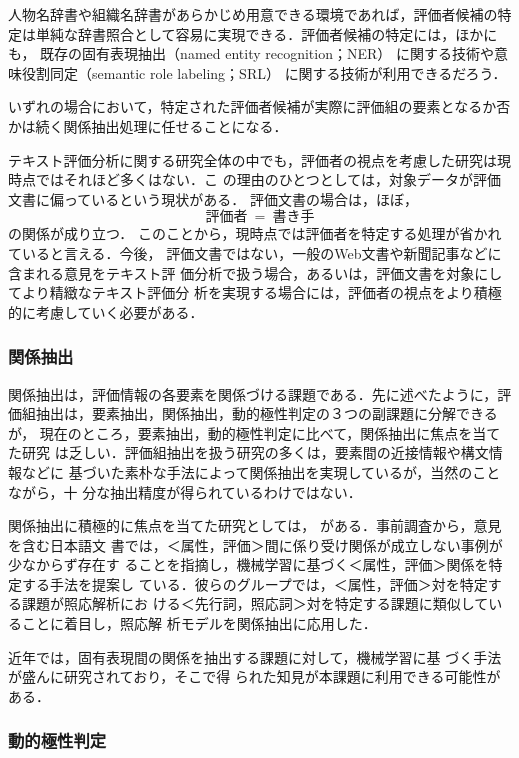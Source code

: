 人物名辞書や組織名辞書があらかじめ用意できる環境であれば，評価者候補の特
定は単純な辞書照合として容易に実現できる．評価者候補の特定には，ほかにも，
既存の固有表現抽出（named entity recognition；NER）\cite{muc6,muc7,irex} 
に関する技術や意味役割同定（semantic role labeling；SRL）
\cite{srl2004,srl2005}に関する技術が利用できるだろう．

いずれの場合において，特定された評価者候補が実際に評価組の要素となるか否
かは続く関係抽出処理に任せることになる．

テキスト評価分析に関する研究全体の中でも，評価者の視点を考慮した研究は現
時点ではそれほど多くはない\cite{kim2004a,bethard2004a,nakayama2005a}．こ
の理由のひとつとしては，対象データが評価文書に偏っているという現状がある．
評価文書の場合は，ほぼ，$$評価者~=~書き手$$の関係が成り立つ．
このことから，現時点では評価者を特定する処理が省かれていると言える．今後，
評価文書ではない，一般のWeb文書や新聞記事などに含まれる意見をテキスト評
価分析で扱う場合，あるいは，評価文書を対象にしてより精緻なテキスト評価分
析を実現する場合には，評価者の視点をより積極的に考慮していく必要がある．

\subsubsection{関係抽出}
\label{sec:rel_ext}

関係抽出は，評価情報の各要素を関係づける課題である．先に述べたように，評
価組抽出は，要素抽出，関係抽出，動的極性判定の３つの副課題に分解できるが，
現在のところ，要素抽出，動的極性判定に比べて，関係抽出に焦点を当てた研究
は乏しい．評価組抽出を扱う研究の多くは，要素間の近接情報や構文情報などに
基づいた素朴な手法によって関係抽出を実現しているが，当然のことながら，十
分な抽出精度が得られているわけではない．

関係抽出に積極的に焦点を当てた研究としては，
\cite{kobayashi2005b,iida2005a}がある．事前調査から，意見を含む日本語文
書では，＜属性，評価＞間に係り受け関係が成立しない事例が少なからず存在す
ることを指摘し，機械学習に基づく＜属性，評価＞関係を特定する手法を提案し
ている．彼らのグループでは，＜属性，評価＞対を特定する課題が照応解析にお
ける＜先行詞，照応詞＞対を特定する課題に類似していることに着目し，照応解
析モデルを関係抽出に応用した．

近年では，固有表現間の関係を抽出する課題\cite{rdc}に対して，機械学習に基
づく手法が盛んに研究されており\cite{zelenko2003a,culotta2004a}，そこで得
られた知見が本課題に利用できる可能性がある．

\subsubsection{動的極性判定}
\label{sec:dyn_pn}

